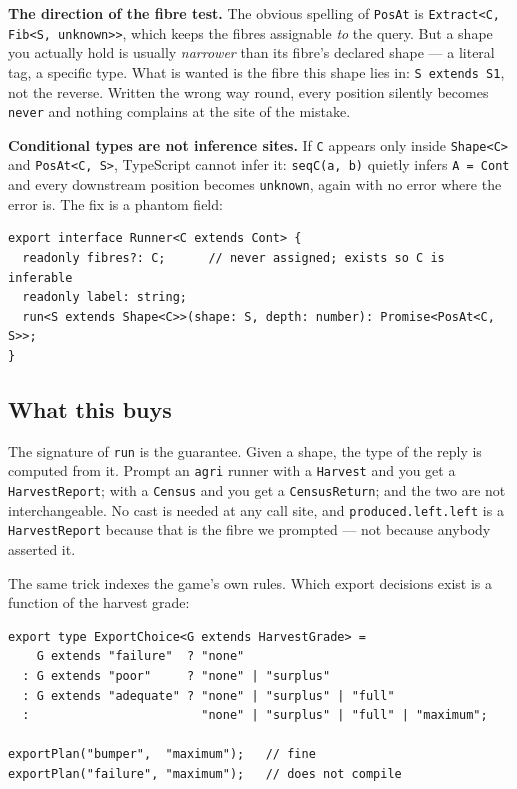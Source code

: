 \documentclass[11pt,a4paper]{article}
\begin{document}
\textbf{The direction of the fibre test.} The obvious spelling of
\texttt{PosAt} is \texttt{Extract<C, Fib<S, unknown>>}, which keeps the fibres
assignable \emph{to} the query. But a shape you actually hold is usually
\emph{narrower} than its fibre's declared shape --- a literal tag, a specific
type. What is wanted is the fibre this shape lies in: \texttt{S extends S1},
not the reverse. Written the wrong way round, every position silently becomes
\texttt{never} and nothing complains at the site of the mistake.

\textbf{Conditional types are not inference sites.} If \texttt{C} appears only
inside \texttt{Shape<C>} and \texttt{PosAt<C, S>}, TypeScript cannot infer it:
\texttt{seqC(a, b)} quietly infers \texttt{A = Cont} and every downstream
position becomes \texttt{unknown}, again with no error where the error is. The
fix is a phantom field:

\begin{lstlisting}
export interface Runner<C extends Cont> {
  readonly fibres?: C;      // never assigned; exists so C is inferable
  readonly label: string;
  run<S extends Shape<C>>(shape: S, depth: number): Promise<PosAt<C, S>>;
}
\end{lstlisting}

\subsection{What this buys}

The signature of \texttt{run} is the guarantee. Given a shape, the type of the
reply is computed from it. Prompt an \texttt{agri} runner with a
\texttt{Harvest} and you get a \texttt{HarvestReport}; with a \texttt{Census}
and you get a \texttt{CensusReturn}; and the two are not interchangeable. No
cast is needed at any call site, and \texttt{produced.left.left} is a
\texttt{HarvestReport} because that is the fibre we prompted --- not because
anybody asserted it.

The same trick indexes the game's own rules. Which export decisions exist is a
function of the harvest grade:

\begin{lstlisting}
export type ExportChoice<G extends HarvestGrade> =
    G extends "failure"  ? "none"
  : G extends "poor"     ? "none" | "surplus"
  : G extends "adequate" ? "none" | "surplus" | "full"
  :                        "none" | "surplus" | "full" | "maximum";

exportPlan("bumper",  "maximum");   // fine
exportPlan("failure", "maximum");   // does not compile
\end{lstlisting}
\end{document}
